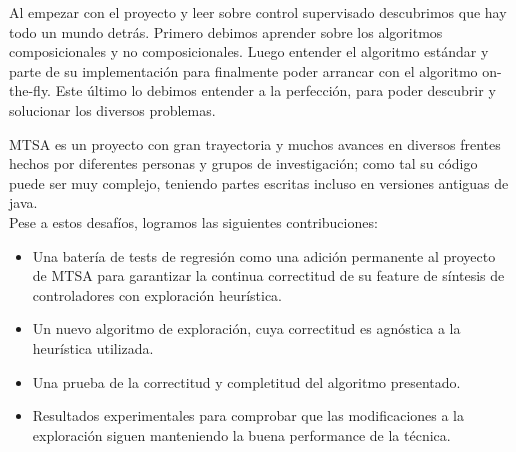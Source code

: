 % 
% 

Al empezar con el proyecto y leer sobre control supervisado descubrimos que hay todo un mundo detrás. Primero debimos aprender sobre los algoritmos composicionales y no composicionales. Luego entender el algoritmo estándar y parte de su implementación para finalmente poder arrancar con el algoritmo on-the-fly. Este último lo debimos entender a la perfección, para poder descubrir y solucionar los diversos problemas. 

MTSA es un proyecto con gran trayectoria y muchos avances en diversos frentes hechos por diferentes personas y grupos de investigación; como tal su código puede ser muy complejo, teniendo partes escritas incluso en versiones antiguas de java.\\

Pese a estos desafíos, logramos las siguientes contribuciones: 
\begin{itemize}
	\item Una batería de tests de regresión como una adición permanente al proyecto de MTSA para garantizar la continua correctitud de su feature de síntesis de controladores con exploración heurística.
	
	\item Un nuevo algoritmo de exploración, cuya correctitud es agnóstica a la heurística utilizada.
	
	\item Una prueba de la correctitud y completitud del algoritmo presentado.
	
	\item Resultados experimentales para comprobar que las modificaciones a la exploración siguen manteniendo la buena performance de la técnica.
\end{itemize}

